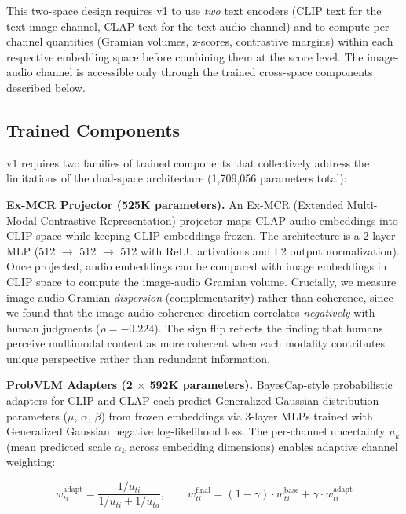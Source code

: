 \documentclass[a4paper,fleqn]{cas-sc}
\begin{document}
\begin{itemize}
This two-space design requires v1 to use \emph{two} text encoders (CLIP text for the text-image channel, CLAP text for the text-audio channel) and to compute per-channel quantities (Gramian volumes, z-scores, contrastive margins) within each respective embedding space before combining them at the score level. The image-audio channel is accessible only through the trained cross-space components described below.

\subsection{Trained Components}\label{sec:v1-trained}

v1 requires two families of trained components that collectively address the limitations of the dual-space architecture (1,709,056 parameters total):

\textbf{Ex-MCR Projector (525K parameters).} An Ex-MCR (Extended Multi-Modal Contrastive Representation) projector maps CLAP audio embeddings into CLIP space while keeping CLIP embeddings frozen. The architecture is a 2-layer MLP (512 $\rightarrow$ 512 $\rightarrow$ 512 with ReLU activations and L2 output normalization). Once projected, audio embeddings can be compared with image embeddings in CLIP space to compute the image-audio Gramian volume. Crucially, we measure image-audio Gramian \emph{dispersion} (complementarity) rather than coherence, since we found that the image-audio coherence direction correlates \emph{negatively} with human judgments ($\rho = -0.224$). The sign flip reflects the finding that humans perceive multimodal content as more coherent when each modality contributes unique perspective rather than redundant information.

\textbf{ProbVLM Adapters (2 $\times$ 592K parameters).} BayesCap-style probabilistic adapters for CLIP and CLAP each predict Generalized Gaussian distribution parameters ($\mu$, $\alpha$, $\beta$) from frozen embeddings via 3-layer MLPs trained with Generalized Gaussian negative log-likelihood loss. The per-channel uncertainty $u_k$ (mean predicted scale $\alpha_k$ across embedding dimensions) enables adaptive channel weighting:

\begin{equation}\label{eq:v1-adaptive}
w_{ti}^{\mathrm{adapt}} = \frac{1/u_{ti}}{1/u_{ti} + 1/u_{ta}}, \qquad w_{ti}^{\mathrm{final}} = (1 - \gamma) \cdot w_{ti}^{\mathrm{base}} + \gamma \cdot w_{ti}^{\mathrm{adapt}}
\end{equation}



\end{itemize}
\end{document}
